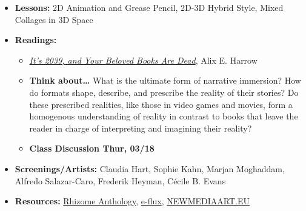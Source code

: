 \def\dMon{Mon, 03/15}
\def\dTues{Tues, 03/16}
\def\dWed{Wed, 03/17}
\def\dThur{Thur, 03/18}
\def\dFri{Fri, 03/19}
\def\dSat{Sat, 03/20}
\def\dSun{Sun, 03/21}
\placeDate

\begin{itemize}[noitemsep,topsep=0pt,leftmargin=*]
    \item \textbf{Lessons:} 2D Animation and Grease Pencil, 2D-3D Hybrid Style, Mixed Collages in 3D Space
    \item \textbf{Readings:}
          \begin{itemize}
              \item \href{https://www.nytimes.com/2019/12/02/opinion/future-virtual-reality-stories.html}{\emph{It’s 2039, and Your Beloved Books Are Dead}}, Alix E. Harrow
              \item \textbf{Think about\dots} What is the ultimate form of narrative immersion? How do formats shape, describe, and prescribe the reality of their stories? Do these prescribed realities, like those in video games and movies, form a homogenous understanding of reality in contrast to books that leave the reader in charge of interpreting and imagining their reality?
              \item \textbf{Class Discussion \dThur}
          \end{itemize}
    \item \textbf{Screenings/Artists:} Claudia Hart, Sophie Kahn, Marjan Moghaddam, Alfredo Salazar-Caro, Frederik Heyman, Cécile B. Evans
    \item \textbf{Resources:} \href{https://anthology.rhizome.org/}{Rhizome Anthology}, \href{https://www.e-flux.com/journal/}{e-flux}, \href{https://www.newmediaart.eu/}{NEWMEDIAART.EU}
\end{itemize}